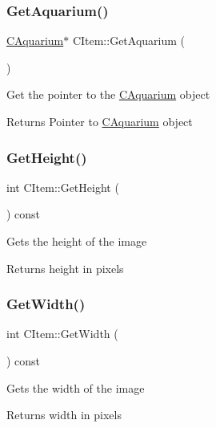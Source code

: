 \subsubsection{\texorpdfstring{Get\+Aquarium()}{GetAquarium()}}
{\footnotesize\ttfamily \mbox{\hyperlink{class_c_aquarium}{C\+Aquarium}}$\ast$ C\+Item\+::\+Get\+Aquarium (\begin{DoxyParamCaption}{ }\end{DoxyParamCaption})\hspace{0.3cm}{\ttfamily [inline]}}

Get the pointer to the \mbox{\hyperlink{class_c_aquarium}{C\+Aquarium}} object \begin{DoxyReturn}{Returns}
Pointer to \mbox{\hyperlink{class_c_aquarium}{C\+Aquarium}} object 
\end{DoxyReturn}
\mbox{\label{class_c_item_a69392bf15fe717049344f519c8a235d0}} 
\subsubsection{\texorpdfstring{Get\+Height()}{GetHeight()}}
{\footnotesize\ttfamily int C\+Item\+::\+Get\+Height (\begin{DoxyParamCaption}{ }\end{DoxyParamCaption}) const\hspace{0.3cm}{\ttfamily [inline]}}

Gets the height of the image \begin{DoxyReturn}{Returns}
height in pixels 
\end{DoxyReturn}
\mbox{\label{class_c_item_a0109712c4628b8d5713291de07a0bc1b}} 
\subsubsection{\texorpdfstring{Get\+Width()}{GetWidth()}}
{\footnotesize\ttfamily int C\+Item\+::\+Get\+Width (\begin{DoxyParamCaption}{ }\end{DoxyParamCaption}) const\hspace{0.3cm}{\ttfamily [inline]}}

Gets the width of the image \begin{DoxyReturn}{Returns}
width in pixels 
\end{DoxyReturn}
\mbox{\label{class_c_item_a394d38a058fc53f0e958ca52248560c8}} 

